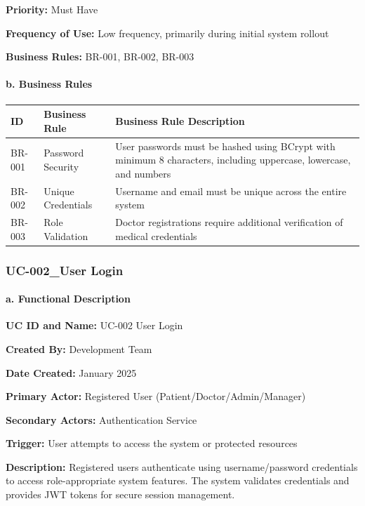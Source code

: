 \documentclass[12pt,a4paper]{article}
\begin{document}
\textbf{Priority:} Must Have

\textbf{Frequency of Use:} Low frequency, primarily during initial system rollout

\textbf{Business Rules:} BR-001, BR-002, BR-003

\paragraph{b. Business Rules}

\begin{longtable}{|p{2cm}|p{4cm}|p{8cm}|}
\hline
\textbf{ID} & \textbf{Business Rule} & \textbf{Business Rule Description} \\
\hline
BR-001 & Password Security & User passwords must be hashed using BCrypt with minimum 8 characters, including uppercase, lowercase, and numbers \\
\hline
BR-002 & Unique Credentials & Username and email must be unique across the entire system \\
\hline
BR-003 & Role Validation & Doctor registrations require additional verification of medical credentials \\
\hline
\end{longtable}

\subsubsection{UC-002\_User Login}

\paragraph{a. Functional Description}

\textbf{UC ID and Name:} UC-002 User Login

\textbf{Created By:} Development Team

\textbf{Date Created:} January 2025

\textbf{Primary Actor:} Registered User (Patient/Doctor/Admin/Manager)

\textbf{Secondary Actors:} Authentication Service

\textbf{Trigger:} User attempts to access the system or protected resources

\textbf{Description:} Registered users authenticate using username/password credentials to access role-appropriate system features. The system validates credentials and provides JWT tokens for secure session management.
\end{document}
